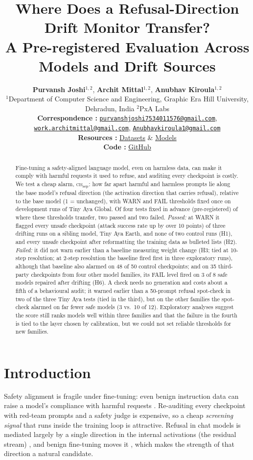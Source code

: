 \documentclass[11pt]{article}
\title{Where Does a Refusal-Direction Drift Monitor Transfer?\\A Pre-registered Evaluation Across Models and Drift Sources}
\author{\textbf{Purvansh Joshi}$^{1,2}$, \textbf{Archit Mittal}$^{1,2}$, \textbf{Anubhav Kiroula}$^{1,2}$ \\[3pt]
  $^{1}$Department of Computer Science and Engineering, Graphic Era Hill University, Dehradun, India \quad $^{2}$PxA Labs \\[6pt]
  {\small \textbf{Correspondence :}
  \href{mailto:purvanshjoshi7534011576@gmail.com}{\texttt{purvanshjoshi7534011576@gmail.com}},
  \href{mailto:work.architmittal@gmail.com}{\texttt{work.architmittal@gmail.com}},
  \href{mailto:Anubhavkiroula1@gmail.com}{\texttt{Anubhavkiroula1@gmail.com}}} \\
  {\small \textbf{Resources :}
  \href{https://huggingface.co/collections/purvansh01/safetypulse-data-6af00b9124ee9d5022a36482}{Datasets}
  \& \href{https://huggingface.co/collections/purvansh01/safetypulse-models-6af00b8f56c773a80af9f7e0}{Models}} \\
  {\small \textbf{Code :} \href{https://github.com/PxA-Labs/safetypulse}{GitHub}}
}
\newcommand{\cissep}{\textsc{cis}$_{\text{sep}}$}
\begin{document}
\maketitle

\begin{abstract}
Fine-tuning a safety-aligned language model, even on harmless data, can make it comply with harmful requests it
used to refuse, and auditing every checkpoint is costly. We test a cheap alarm, \cissep{}: how far apart harmful and
harmless prompts lie along the base model's refusal direction (the activation direction that carries refusal),
relative to the base model (1 = unchanged), with WARN and FAIL thresholds fixed once on development runs of Tiny Aya
Global. Of four tests fixed in advance (pre-registered) of where these thresholds transfer, two passed and two failed.
\emph{Passed:} at WARN it flagged every unsafe checkpoint (attack success rate up by over 10 points) of three drifting
runs on a sibling model, Tiny Aya Earth, and none of two control runs (H1), and every unsafe checkpoint after
reformatting the training data as bulleted lists (H2). \emph{Failed:} it did not warn earlier than a baseline measuring
weight change (H3; tied at 10-step resolution; at 2-step resolution the baseline fired first in three exploratory
runs), although that baseline also alarmed on 48 of 50 control checkpoints; and on 35 third-party checkpoints from four
other model families, its FAIL level fired on 3 of 8 safe models repaired after drifting (H6). A check needs no
generation and costs about a fifth of a behavioural audit; it warned earlier than a 50-prompt refusal spot-check in two
of the three Tiny Aya tests (tied in the third), but on the other families the spot-check alarmed on far fewer safe
models (3 vs.\ 10 of 12). Exploratory analyses suggest the score still ranks models well within three families and that
the failure in the fourth is tied to the layer chosen by calibration, but we could not set reliable thresholds for new
families.
\end{abstract}

\section{Introduction}

Safety alignment is fragile under fine-tuning: even benign instruction data can raise a model's compliance with harmful
requests \citep{qi2023finetuning,he2024safedata}. Re-auditing every checkpoint with red-team prompts and a safety
judge is expensive, so a cheap \emph{screening signal} that runs inside the training loop is attractive. Refusal in chat
models is mediated largely by a single direction in the internal activations (the residual stream) \citep{arditi2024refusal}, and benign fine-tuning moves
it \citep{du2025procon}, which makes the strength of that direction a natural candidate.
\end{document}
